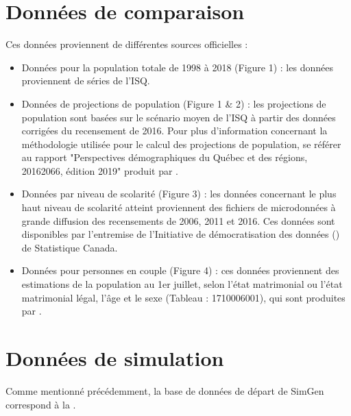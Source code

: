 \documentclass[letterpaper,10pt,french]{sphinxmanual}
\begin{document}
\section{Données de comparaison}
\label{\detokenize{resultats:donnees-de-comparaison}}
Ces données proviennent de différentes sources officielles :
\begin{itemize}
\item {} 
Données pour la population totale de 1998 à 2018 (Figure 1) : les données proviennent de séries de l’ISQ.

\item {} 
Données de projections de population (Figure 1 \& 2) : les projections de population sont basées sur le scénario moyen de l’ISQ à partir des données corrigées du recensement de 2016. Pour plus d’information concernant la méthodologie utilisée pour le calcul des projections de population, se référer au rapport "Perspectives démographiques du Québec et des régions, 2016\sphinxhyphen{}2066, édition 2019" produit par .

\item {} 
Données par niveau de scolarité (Figure 3) : les données concernant le plus haut niveau de scolarité atteint proviennent des fichiers de microdonnées à grande diffusion des recensements de 2006, 2011 et 2016. Ces données sont disponibles par l’entremise de l’Initiative de démocratisation des données () de Statistique Canada.

\item {} 
Données pour personnes en couple (Figure 4) : ces données proviennent des estimations de la population au 1er juillet, selon l’état matrimonial ou l’état matrimonial légal, l’âge et le sexe (Tableau : 17\sphinxhyphen{}10\sphinxhyphen{}0060\sphinxhyphen{}01), qui sont produites par .

\end{itemize}


\section{Données de simulation}
\label{\detokenize{resultats:donnees-de-simulation}}
Comme mentionné précédemment, la base de données de départ de SimGen correspond à la .
\end{document}
